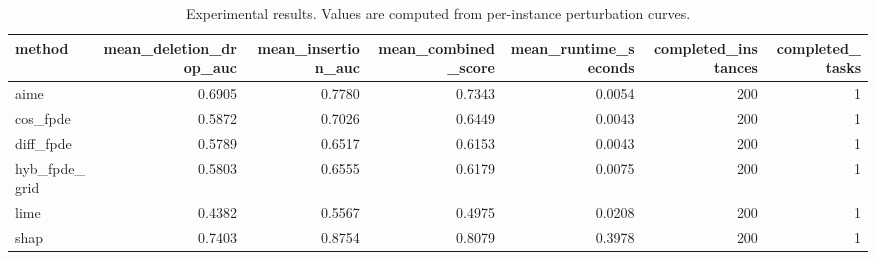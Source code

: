 \begin{table}[t]
\caption{Experimental results. Values are computed from per-instance perturbation curves.}
\label{tab:main_results_computed}
\centering
\begin{tabular}{lrrrrrr}
\toprule
method & mean\_deletion\_drop\_auc & mean\_insertion\_auc & mean\_combined\_score & mean\_runtime\_seconds & completed\_instances & completed\_tasks \\
\midrule
aime & 0.6905 & 0.7780 & 0.7343 & 0.0054 & 200 & 1 \\
cos\_fpde & 0.5872 & 0.7026 & 0.6449 & 0.0043 & 200 & 1 \\
diff\_fpde & 0.5789 & 0.6517 & 0.6153 & 0.0043 & 200 & 1 \\
hyb\_fpde\_grid & 0.5803 & 0.6555 & 0.6179 & 0.0075 & 200 & 1 \\
lime & 0.4382 & 0.5567 & 0.4975 & 0.0208 & 200 & 1 \\
shap & 0.7403 & 0.8754 & 0.8079 & 0.3978 & 200 & 1 \\
\bottomrule
\end{tabular}

\end{table}
